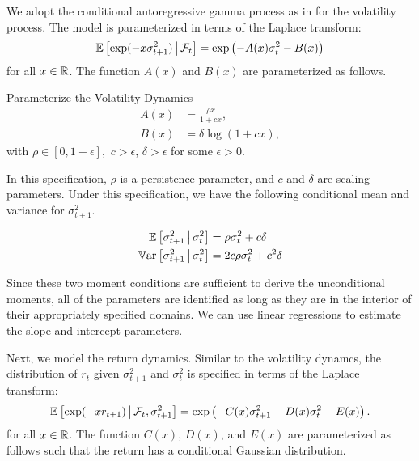 \documentclass[11pt, letterpaper, twoside]{article}
\begin{document}
We adopt the conditional autoregressive gamma process as in \textcite{gourieroux2006autoregressive, han2018leverage} for the volatility process. The model is parameterized in terms of the Laplace transform: 
%
\begin{equation}
    \operatorname{\mathbb{E}}\left[\exp(-x \sigma^2_{t+1}) \,\middle\vert\, \mathcal{F}_{t}\right] = \exp\left(- A(x) \sigma^2_{t} - B(x)\right)
\end{equation}
%
for all $x \in \mathbb{R}$. The function $A(x)$ and $B(x)$ are parameterized as follows.


\begin{defn}{Parameterize the Volatility Dynamics}
     \label{defn:physical_vol_dynamics}
     \begin{align}
        \label{defn:a_PP}
        A(x) &= \frac{\rho x}{1 + c x}, \\
        \label{defn:b_PP}
        B(x) &= \delta \log(1 + c x),
     \end{align}
with $\rho \in [0,1-\epsilon],$ $c > \epsilon$, $\delta > \epsilon$ for some $\epsilon > 0$.
\end{defn}

In this specification, $\rho$ is a persistence parameter, and $c$ and $\delta$ are scaling parameters. Under this specification, we have the following conditional mean and variance for $\sigma^2_{t+1}$.


\begin{remark} 
 \label{remark:vol_moment_conditions}
    \begin{align}
        \E\left[\sigma^2_{t+1} \mvert \sigma^2_t \right] &= \rho \sigma^2_t + c \delta\\
%   
        \Var\left[\sigma^2_{t+1} \mvert \sigma^2_t \right] &= 2 c \rho \sigma^2_t + c^2 \delta 
%   
    \end{align}
\end{remark}

Since these two moment conditions are sufficient to derive the unconditional moments, all of the parameters are identified as long as they are in the interior of their appropriately specified domains. We can use linear regressions to estimate the slope and intercept parameters.



Next, we model the return dynamics. Similar to the volatility dynamcs, the distribution of $r_t$ given $\sigma^2_{t+1}$ and $\sigma^2_{t}$ is specified in terms of the Laplace transform:
%
\begin{equation}
    \operatorname{\mathbb{E}}\left[\exp(- x r_{t+1}) \,\middle\vert\, \mathcal{F}_{t}, \sigma^2_{t+1} \right] = \exp\left(- C(x) \sigma^2_{t+1} - D(x) \sigma^2_t - E(x)\right).
\end{equation}
%
for all $x \in \mathbb{R}$. The function $C(x)$, $D(x)$, and $E(x)$ are parameterized as follows such that the return has a conditional Gaussian distribution.
\end{document}
